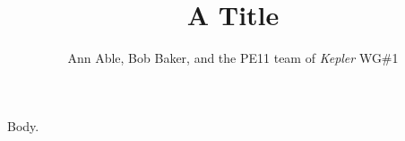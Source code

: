 \documentclass{article}
\begin{document}
\title{A Title}
\author{Ann Able, Bob Baker, and the PE11 team of {\it Kepler} WG\#1}
\maketitle
Body.
\end{document}
